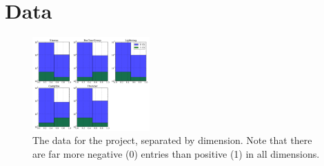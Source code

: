 \section{Data}

\begin{figure}[H]
  \centering
		\includegraphics[width=0.4\textwidth]{images/data.png}
  \caption{The data for the project, separated by dimension.  Note that there are far more negative (0) entries than positive (1) in all dimensions.}
\end{figure}
 






